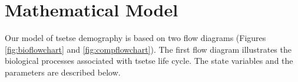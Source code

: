 \documentclass[smallextended]{svjour3}
\newcommand{\comment}[3]{\textcolor{#1}{\textbf{[#2: }\textit{#3}\textbf{]}}}
\newcommand{\jd}[1]{\comment{cyan}{JD}{#1}}
\newcommand{\eb}[1]{\comment{blue}{EB}{#1}}
\begin{document}


\section{Mathematical Model}
Our model of tsetse demography is based on two flow diagrams (Figures \ref{fig:bioflowchart} and \ref{fig:compflowchart}). The first flow diagram illustrates the biological processes associated with tsetse life cycle. The state variables and the parameters are described below.   
\end{document}
